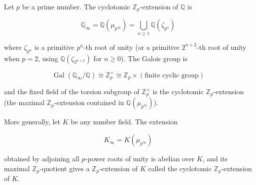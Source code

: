 Let $p$ be a prime number. The cyclotomic $\mathbb{Z}_p$-extension of $\mathbb{Q}$ is

$$
\mathbb{Q}_\infty = \mathbb{Q}(\mu_{p^\infty}) = \bigcup_{n \geq 1} \mathbb{Q}(\zeta_{p^n})
$$

where $\zeta_{p^n}$ is a primitive $p^n$-th root of unity (or a primitive $2^{n+2}$-th root of unity when $p = 2$, using $\mathbb{Q}(\zeta_{2^{n+2}})$ for $n \geq 0$). The Galois group is

$$
\operatorname{Gal}(\mathbb{Q}_\infty / \mathbb{Q}) \cong \mathbb{Z}_p^\times \cong \mathbb{Z}_p \times (\text{finite cyclic group})
$$

and the fixed field of the torsion subgroup of $\mathbb{Z}_p^\times$ is the cyclotomic $\mathbb{Z}_p$-extension (the maximal $\mathbb{Z}_p$-extension contained in $\mathbb{Q}(\mu_{p^\infty})$).

More generally, let $K$ be any number field. The extension

$$
K_\infty = K(\mu_{p^\infty})
$$

obtained by adjoining all $p$-power roots of unity is abelian over $K$, and its maximal $\mathbb{Z}_p$-quotient gives a $\mathbb{Z}_p$-extension of $K$ called the cyclotomic $\mathbb{Z}_p$-extension of $K$.
